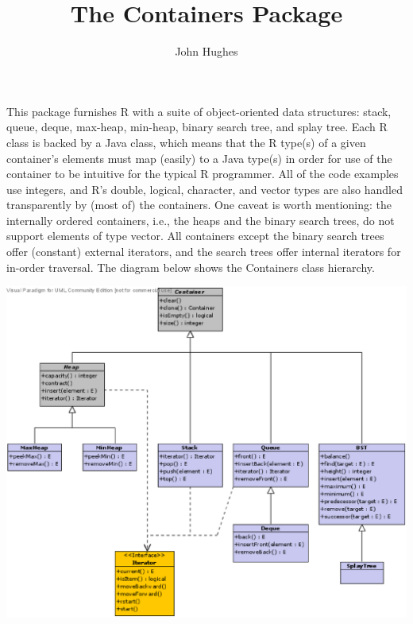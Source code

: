 \documentclass[10pt]{article}
\title{The Containers Package}
\author{John Hughes}
\begin{document}
\maketitle
This package furnishes R with a suite of object-oriented data structures: stack, queue, deque, max-heap, min-heap, binary search tree, and splay tree. Each R class is backed by a Java class, which means that the R type(s) of a given container's elements must map (easily) to a Java type(s) in order for use of the container to be intuitive for the typical R programmer. All of the code examples use integers, and R's double, logical, character, and vector types are also handled transparently by (most of) the containers. One caveat is worth mentioning: the internally ordered containers, i.e., the heaps and the binary search trees, do not support elements of type vector. All containers except the binary search trees offer (constant) external iterators, and the search trees offer internal iterators for in-order traversal. The diagram below shows the Containers class hierarchy.\bigskip

\includegraphics[scale=1]{Containers.eps}
\end{document}
